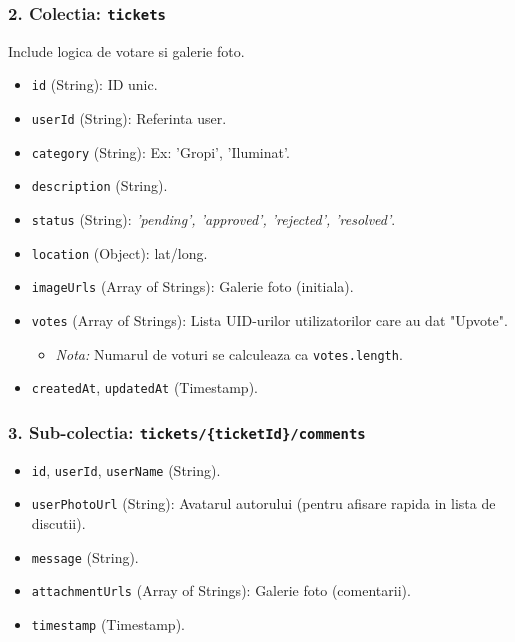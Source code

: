 \documentclass[12pt, a4paper]{article}
\begin{document}
\subsubsection{2. Colectia: \texttt{tickets}}
Include logica de votare si galerie foto.
\begin{itemize}
    \item \texttt{id} (String): ID unic.
    \item \texttt{userId} (String): Referinta user.
    \item \texttt{category} (String): Ex: 'Gropi', 'Iluminat'.
    \item \texttt{description} (String).
    \item \texttt{status} (String): \textit{'pending', 'approved', 'rejected', 'resolved'}.
    \item \texttt{location} (Object): lat/long.
    \item \texttt{imageUrls} (Array of Strings): Galerie foto (initiala).
    \item \texttt{votes} (Array of Strings): Lista UID-urilor utilizatorilor care au dat "Upvote".
        \begin{itemize}
            \item \textit{Nota:} Numarul de voturi se calculeaza ca \texttt{votes.length}.
        \end{itemize}
    \item \texttt{createdAt}, \texttt{updatedAt} (Timestamp).
\end{itemize}

\subsubsection{3. Sub-colectia: \texttt{tickets/\{ticketId\}/comments}}
\begin{itemize}
    \item \texttt{id}, \texttt{userId}, \texttt{userName} (String).
    \item \texttt{userPhotoUrl} (String): Avatarul autorului (pentru afisare rapida in lista de discutii).
    \item \texttt{message} (String).
    \item \texttt{attachmentUrls} (Array of Strings): Galerie foto (comentarii).
    \item \texttt{timestamp} (Timestamp).
\end{itemize}
\end{document}

